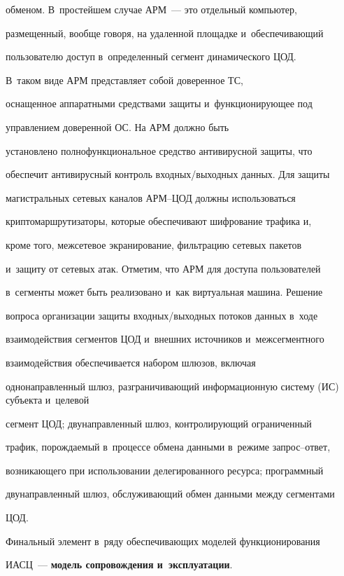 обменом. В~простейшем случае АРМ~--- это отдельный компьютер, 


размещенный, вообще говоря, на удаленной площадке и~обеспечивающий 


пользователю доступ в~определенный сегмент динамического ЦОД. 


В~таком виде АРМ представляет собой доверенное ТС, 


оснащенное аппаратными средствами защиты и~функционирующее под 


управлением доверенной ОС. На АРМ должно быть 


установлено полнофункциональное средство антивирусной защиты, что 


обеспечит антивирусный контроль входных/выходных данных. Для защиты 


магистральных сетевых каналов АРМ--ЦОД должны использоваться 


криптомаршрутизаторы, которые обеспечивают шифрование трафика и, 


кроме того, межсетевое экранирование, фильтрацию сетевых пакетов 


и~защиту от сетевых атак. Отметим, что АРМ для доступа пользователей 


в~сегменты может быть реализовано и~как виртуальная машина. Решение 


вопроса организации защиты вход\-ных\!/\!вы\-ход\-ных потоков данных в~ходе 


взаимодействия сегментов ЦОД и~внешних источников и~межсегментного 


взаимодействия обеспечивается набором шлюзов, включая 


однонаправленный шлюз, разграничивающий информационную систему (ИС) субъекта и~целевой 


сегмент ЦОД; двунаправленный шлюз, контролирующий ограниченный 


трафик, порождаемый в~процессе обмена данными в~режиме запрос--ответ, 


возникающего при использовании делегированного ресурса; программный 


двунаправленный шлюз, обслуживающий обмен данными между сегментами 


ЦОД.





Финальный элемент в~ряду обеспечивающих моделей функционирования 


ИАСЦ~--- \textbf{модель сопровождения и~эксплуатации}. 


